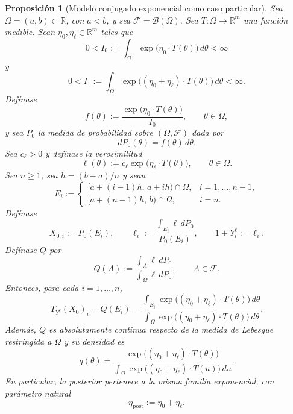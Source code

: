 \documentclass[12pt]{article}
\newtheorem{proposicion}{Proposición}[section]
\begin{document}
\begin{proposicion}[Modelo conjugado exponencial como caso particular]\label{prop:conjugado_exponencial_CI}
Sea $\Omega=(a,b)\subset\mathbb R$, con $a<b$, y sea $\mathcal F=\mathcal B(\Omega)$. Sea $T:\Omega\to\mathbb R^m$ una función medible. Sean $\eta_0,\eta_\ell\in\mathbb R^m$ tales que
\[
0<
I_0:=\int_\Omega \exp\bigl(\eta_0\cdot T(\theta)\bigr)\,d\theta
<\infty
\]
y
\[
0<
I_1:=\int_\Omega \exp\bigl((\eta_0+\eta_\ell)\cdot T(\theta)\bigr)\,d\theta
<\infty.
\]
Defínase
\[
f(\theta):=\frac{\exp\bigl(\eta_0\cdot T(\theta)\bigr)}{I_0},
\qquad \theta\in\Omega,
\]
y sea $P_0$ la medida de probabilidad sobre $(\Omega,\mathcal F)$ dada por
\[
dP_0(\theta)=f(\theta)\,d\theta.
\]
Sea $c_\ell>0$ y defínase la verosimilitud
\[
\ell(\theta):=c_\ell\exp\bigl(\eta_\ell\cdot T(\theta)\bigr),
\qquad \theta\in\Omega.
\]
Sea $n\ge1$, sea $h=(b-a)/n$ y sean
\[
E_i:=
\begin{cases}
[a+(i-1)h,\,a+ih)\cap\Omega, & i=1,\dots,n-1,\\[4pt]
[a+(n-1)h,\,b)\cap\Omega, & i=n.
\end{cases}
\]
Defínase
\[
X_{0,i}:=P_0(E_i),
\qquad
\ell_i:=\frac{\displaystyle\int_{E_i}\ell\,dP_0}{P_0(E_i)},
\qquad
1+Y_i^\ell:=\ell_i.
\]
Defínase $Q$ por
\[
Q(A):=\frac{\displaystyle\int_A\ell\,dP_0}{\displaystyle\int_\Omega\ell\,dP_0},
\qquad A\in\mathcal F.
\]
Entonces, para cada $i=1,\dots,n$,
\[
T_{Y^\ell}(X_0)_i
=
Q(E_i)
=
\frac{\displaystyle\int_{E_i}\exp\bigl((\eta_0+\eta_\ell)\cdot T(\theta)\bigr)\,d\theta}{\displaystyle\int_\Omega\exp\bigl((\eta_0+\eta_\ell)\cdot T(\theta)\bigr)\,d\theta}.
\]
Además, $Q$ es absolutamente continua respecto de la medida de Lebesgue restringida a $\Omega$ y su densidad es
\[
q(\theta)
=
\frac{\exp\bigl((\eta_0+\eta_\ell)\cdot T(\theta)\bigr)}{\displaystyle\int_\Omega\exp\bigl((\eta_0+\eta_\ell)\cdot T(u)\bigr)\,du}.
\]
En particular, la posterior pertenece a la misma familia exponencial, con parámetro natural
\[
\eta_{\mathrm{post}}:=\eta_0+\eta_\ell.
\]
\end{proposicion}
\end{document}
